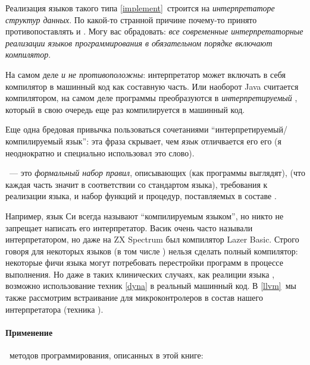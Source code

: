 \clearpage
Реализация языков такого типа \ref{implement}\ строится на \emph{интерпретаторе
структур данных}. По какой-то странной причине почему-то принято
противопоставлять  и . Могу вас
обрадовать: \textit{все современные интерпретаторные реализации языков
программирования в обязательном порядке включают компилятор}.

На самом деле
\emph{ и  не противоположны}:
интерпретатор может включать в себя компилятор в машинный код как
составную часть. Или наоборот Java считается компилятором, на самом деле
программы преобразуются в \textit{интерпретируемый} , который в
свою очередь еще раз компилируется в машинный код.

Еще одна бредовая привычка пользоваться сочетаниями
``интерпретируемый/компилируемый язык'': эта фраза скрывает, чем \emph{язык}
отличвается его его  (я неоднократно и специально использовал
это слово).

\ --- это \emph{формальный набор
правил}, описывающих  (как программы выглядят), 
(что каждая часть значит в соответствии со стандартом языка), требования к
 реализации языка, и  набор функций и процедур, поставляемых в составе .

Например, язык Си всегда называют ``компилируемым языком'', но никто не
запрещает написать его интерпретатор. Васик очень часто называли
интерпретатором, но даже на ZX Spectrum был компилятор Lazer Basic. Строго
говоря для некоторых языков (в том числе \metal) нельзя сделать полный
компилятор: некоторые фичи языка могут потребовать перестройки программ в
процессе выполнения. Но даже в таких клинических случаях, как реалиции языка
\lisp, возможно использование техник  \ref{dyna}
в реальный машинный код. В \ref{llvm}\ мы также рассмотрим встраивание
 для микроконтролеров в состав нашего интерпретатора
(техника ).

\clearpage
\paragraph{Применение}\ методов программирования, описанных в этой книге:\\
\bigskip

